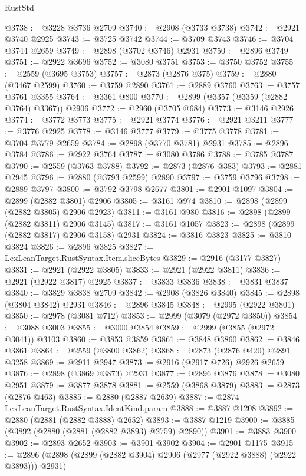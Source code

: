 \begin{lexlean}{RustStd}
\begin{coremodule}
@3738 := @3228 @3736 @2709
@3740 := @2908 (@3733 @3738)
@3742 := @2921 @3740 @2925
@3743 := @3725 @3742
@3744 := @3709 @3743
@3746 := @3704 @3744 @2659
@3749 := @2898 (@3702 @3746) @2931
@3750 := @2896 @3749
@3751 := @2922 @3696
@3752 := @3080 @3751
@3753 := @3750 @3752
@3755 := @2559 (@3695 @3753)
@3757 := @2873 (@2876 @375)
@3759 := @2880 (@3467 @2599)
@3760 := @3759 @2890
@3761 := @2889 @3760
@3763 := @3757 @3761 @3355
@3764 := @3361 @800
@3770 := @2899 (@3357 (@3359 (@2882 @3764) @3367)) @2906
@3772 := @2960 (@3705 @684)
@3773 := @3146 @2926
@3774 := @3772 @3773
@3775 := @2921 @3774
@3776 := @2921 @3211
@3777 := @3776 @2925
@3778 := @3146 @3777
@3779 := @3775 @3778
@3781 := @3704 @3779 @2659
@3784 := @2898 (@3770 @3781) @2931
@3785 := @2896 @3784
@3786 := @2922 @3764
@3787 := @3080 @3786
@3788 := @3785 @3787
@3790 := @2559 (@3763 @3788)
@3792 := @2873 (@2876 @383)
@3793 := @2881 @2945
@3796 := @2880 (@3793 @2599) @2890
@3797 := @3759 @3796
@3798 := @2889 @3797
@3800 := @3792 @3798 @2677
@3801 := @2901 @1097
@3804 := @2899 (@2882 @3801) @2906
@3805 := @3161 @974
@3810 := @2898 (@2899 (@2882 @3805) @2906 @2923)
@3811 := @3161 @980
@3816 := @2898 (@2899 (@2882 @3811) @2906 @3145)
@3817 := @3161 @1057
@3823 := @2898 (@2899 (@2882 @3817) @2906 @3158) @2931
@3824 := @3816 @3823
@3825 := @3810 @3824
@3826 := @2896 @3825
@3827 := LexLeanTarget.RustSyntax.Item.sliceBytes
@3829 := @2916 (@3177 @3827)
@3831 := @2921 (@2922 @3805)
@3833 := @2921 (@2922 @3811)
@3836 := @2921 (@2922 @3817) @2925
@3837 := @3833 @3836
@3838 := @3831 @3837
@3840 := @3829 @3838 @2709
@3842 := @2908 (@3826 @3840)
@3845 := @2898 (@3804 @3842) @2931
@3846 := @2896 @3845
@3848 := @2995 (@2922 @3801)
@3850 := @2978 (@3081 @712)
@3853 := @2999 (@3079 (@2972 @3850))
@3854 := @3088 @3003
@3855 := @3000 @3854
@3859 := @2999 (@3855 (@2972 @3041)) @3103
@3860 := @3853 @3859
@3861 := @3848 @3860
@3862 := @3846 @3861
@3864 := @2559 (@3800 @3862)
@3868 := @2873 (@2876 @420) @2891 @3258
@3869 := @2911 @2947
@3873 := @2916 (@2917 @726) @2926 @2659
@3876 := @2898 (@3869 @3873) @2931
@3877 := @2896 @3876
@3878 := @3080 @2951
@3879 := @3877 @3878
@3881 := @2559 (@3868 @3879)
@3883 := @2873 (@2876 @463)
@3885 := @2880 (@2887 @2639)
@3887 := @2874 LexLeanTarget.RustSyntax.IdentKind.param
@3888 := @3887 @1208
@3892 := @2880 (@2881 (@2882 @3888) @2652)
@3893 := @3887 @1219
@3900 := @3885 (@3892 (@2880 (@2881 (@2882 @3893) @2759) @2890))
@3901 := @3883 @3900
@3902 := @2893 @2652
@3903 := @3901 @3902
@3904 := @2901 @1175
@3915 := @2896 (@2898 (@2899 (@2882 @3904) @2906 (@2977 (@2922 @3888) (@2922 @3893))) @2931)

\end{coremodule}
\end{lexlean}
